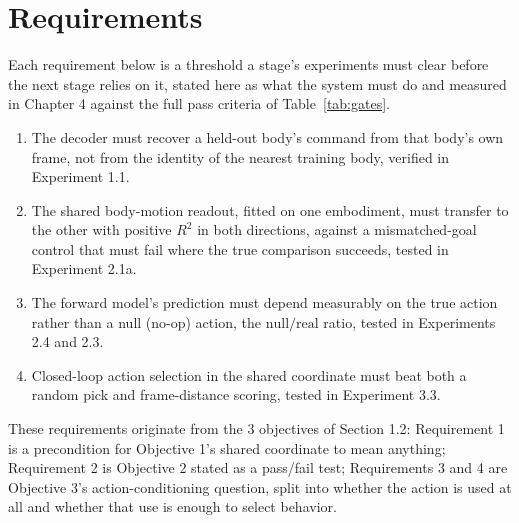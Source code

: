 \documentclass[12pt,a4paper,oneside]{report}
\begin{document}
\section{Requirements}
Each requirement below is a threshold a stage's experiments must clear before the next stage relies on it, stated
here as what the system must do and measured in Chapter 4 against the full pass criteria of Table~\ref{tab:gates}.
\begin{enumerate}[label=\arabic*.]
\item The decoder must recover a held-out body's command from that body's own frame, not from the identity of the
  nearest training body, verified in Experiment 1.1.
\item The shared body-motion readout, fitted on one embodiment, must transfer to the other with positive $R^2$ in
  both directions, against a mismatched-goal control that must fail where the true comparison succeeds, tested in
  Experiment 2.1a.
\item The forward model's prediction must depend measurably on the true action rather than a null (no-op) action,
  the $\mathrm{null}/\mathrm{real}$ ratio, tested in Experiments 2.4 and 2.3.
\item Closed-loop action selection in the shared coordinate must beat both a random pick and frame-distance scoring,
  tested in Experiment 3.3.
\end{enumerate}
These requirements originate from the 3 objectives of Section 1.2: Requirement 1 is a precondition for
Objective 1's shared coordinate to mean anything; Requirement 2 is Objective 2 stated as a pass/fail test;
Requirements 3 and 4 are Objective 3's action-conditioning question, split into whether the action is used at all
and whether that use is enough to select behavior.
\end{document}
